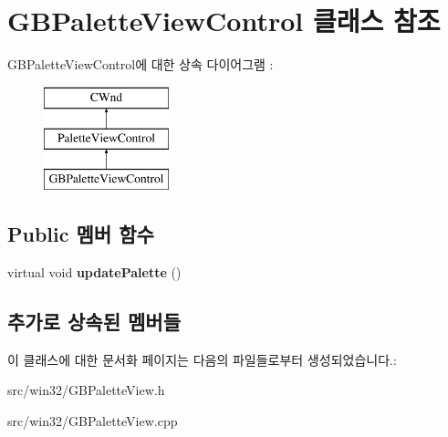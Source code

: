 \hypertarget{class_g_b_palette_view_control}{}\section{G\+B\+Palette\+View\+Control 클래스 참조}
\label{class_g_b_palette_view_control}
G\+B\+Palette\+View\+Control에 대한 상속 다이어그램 \+: \begin{figure}[H]
\begin{center}
\leavevmode
\includegraphics[height=3.000000cm]{class_g_b_palette_view_control}
\end{center}
\end{figure}
\subsection*{Public 멤버 함수}
\begin{DoxyCompactItemize}
\item 
\mbox{\label{class_g_b_palette_view_control_a0fb70c16ea8f4731e7159df59beb3c6e}} 
virtual void {\bfseries update\+Palette} ()
\end{DoxyCompactItemize}
\subsection*{추가로 상속된 멤버들}


이 클래스에 대한 문서화 페이지는 다음의 파일들로부터 생성되었습니다.\+:\begin{DoxyCompactItemize}
\item 
src/win32/G\+B\+Palette\+View.\+h\item 
src/win32/G\+B\+Palette\+View.\+cpp\end{DoxyCompactItemize}
